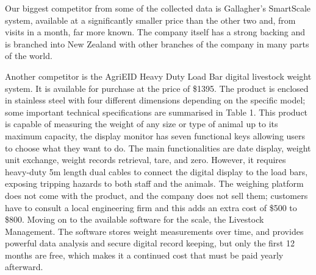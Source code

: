 Our biggest competitor from some of the collected data is Gallagher's SmartScale system, available at a significantly smaller price than the other two and, from visits in a month, far more known. The company itself has a strong backing and is branched into New Zealand with other branches of the company in many parts of the world.

Another competitor is the AgriEID Heavy Duty Load Bar digital livestock weight system. It is available for purchase at the price of \$1395. The product is enclosed in stainless steel with four different dimensions depending on the specific model; some important technical specifications are summarised in Table 1. This product is capable of measuring the weight of any size or type of animal up to its maximum capacity, the display monitor has seven functional keys allowing users to choose what they want to do. The main functionalities are date display, weight unit exchange, weight records retrieval, tare, and zero. However, it requires heavy-duty 5m length dual cables to connect the digital display to the load bars, exposing tripping hazards to both staff and the animals. The weighing platform does not come with the product, and the company does not sell them; customers have to consult a local engineering firm and this adds an extra cost of \$500 to \$800. Moving on to the available software for the scale, the Livestock Management. The software stores weight measurements over time, and provides powerful data analysis and secure digital record keeping, but only the first 12 months are free, which makes it a continued cost that must be paid yearly afterward.


